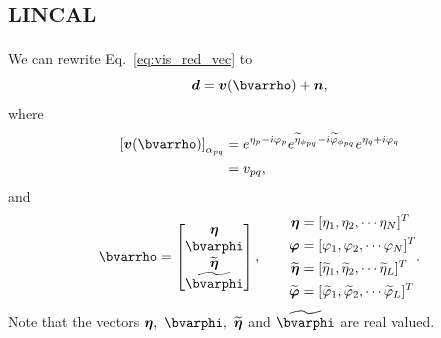 \documentclass[useAMS,usenatbib]{mn2e}
\newcommand{\bd}{\bmath{d}}
\newcommand{\bv}{\bmath{v}}
\newcommand{\bn}{\bmath{n}}
\begin{document}
\section{\textsc{lincal}}
\label{sec:lincal}
We can rewrite Eq.~\eqref{eq:vis_red_vec} to \citep{Liu2010}
\begin{equation}
\label{eq:lincal_vec}
\bd = \bv(\bvarrho) + \bn, 
\end{equation}
where 
\begin{align}
\left [ \bv(\bvarrho) \right ]_{\alpha_{pq}} &= e^{\eta_p - i \varphi_p} e^{\widetilde{\eta}_{\phi_{pq}}- i \widetilde{\varphi}_{\phi_{pq}}} e^{\eta_q + i \varphi_q}\\
&= v_{pq},
\end{align}
and
\begin{equation}
\bvarrho = 
\begin{bmatrix}
\bmath{\eta} \\
\bvarphi \\
\widetilde{\bmath{\eta}} \\
\widetilde{\bvarphi}
\end{bmatrix},\qquad
\begin{aligned}
\bmath{\eta} &= [\eta_1, \eta_2,\cdots \eta_N]^T\\
 \bmath{\varphi} &= [\varphi_1, \varphi_2,\cdots \varphi_N]^T\\
 \widetilde{\bmath{\eta}} &= [\widetilde{\eta}_1, \widetilde{\eta}_2,\cdots \widetilde{\eta}_L]^T\\
 \widetilde{\bmath{\varphi}} &= [\widetilde{\varphi}_1, \widetilde{\varphi}_2,\cdots \widetilde{\varphi}_L]^T
\end{aligned}.
\label{eq:help}
\end{equation}
Note that the vectors $\bmath{\eta},~\bvarphi,~\widetilde{\bmath{\eta}}$ and $\widetilde{\bvarphi}$ are real valued.
\end{document}
